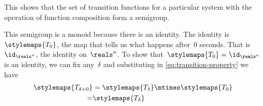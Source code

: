 \begin{example}
    This shows that the set of transition functions for a particular system with the operation of function composition form a semigroup.
    
    This semigroup is a monoid because there is an identity.
    The identity is~$\stylemaps{T_0}$, the map that tells us what happens after~$0$ seconds.
    That is~$\id_{\reals^n}$, the identity on~$\reals^n$.
    To show that~$\stylemaps{T_0} = \id_{\reals^n}$ is an identity, we can fix any~$\delta$ and substituting in \cref{eq:transition-property} we have
    \begin{equation*}
        \begin{aligned}
            \stylemaps{T_{\delta + 0}}&= \stylemaps{T_{\delta}} \mtimes \stylemaps{T_{0}} \\
            = & \stylemaps{T_{\delta}}
        \end{aligned}
    \end{equation*}

\end{example}


